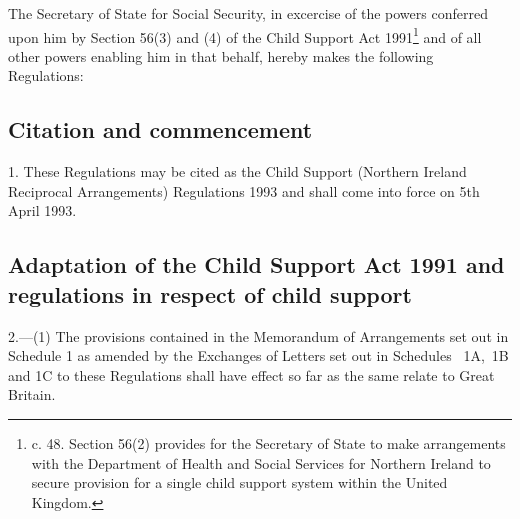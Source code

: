 \documentclass[12pt,a4paper]{article}
\title{\regstitle}
\author{S.I. 1993 No. 584}
\date{Made 10th March 1993\\Laid before Parliament 15th March 1993\\Coming into force 5th April 1993}
\begin{document}
\maketitle

\noindent
The Secretary of State for Social Security, in excercise of the powers conferred upon him by Section 56(3) and (4) of the Child Support Act 1991\footnote{ c. 48. Section 56(2) provides for the Secretary of State to make arrangements with the Department of Health and Social Services for Northern Ireland to secure provision for a single child support system within the United Kingdom.} and of all other powers enabling him in that behalf, hereby makes the following Regulations:

{\sloppy

\tableofcontents

}

\setcounter{secnumdepth}{-2}

\subsection[1. Citation and commencement]{Citation and commencement}

1.  These Regulations may be cited as the Child Support (Northern Ireland Reciprocal Arrangements) Regulations 1993 and shall come into force on 5th April 1993.

\subsection[2. Adaptation of the Child Support Act 1991 and regulations in respect of child support]{Adaptation of the Child Support Act 1991 and regulations in respect of child support}

2.—(1) The provisions contained in the Memorandum of Arrangements set out in Schedule 1 
as amended by the 
Exchanges of Letters set out in Schedules~%
1A,~1B and 1C  %
to these Regulations shall have effect so far as the same relate to Great Britain.
\end{document}
